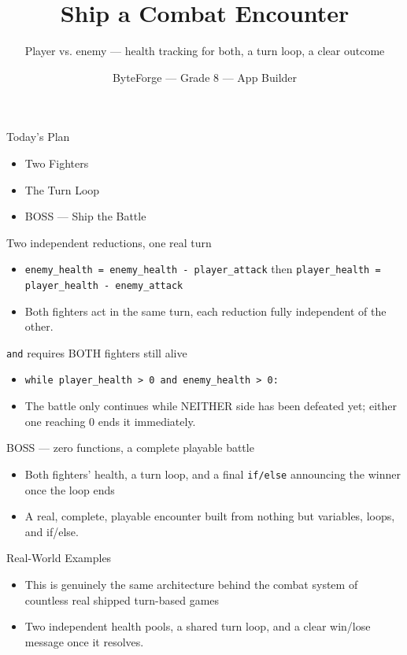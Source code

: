 \documentclass[aspectratio=169]{beamer}
\title{Ship a Combat Encounter}
\subtitle{Player vs. enemy — health tracking for both, a turn loop, a clear outcome}
\author{ByteForge --- Grade 8 --- App Builder}
\date{}
\begin{document}
\begin{frame}
    \titlepage
\end{frame}

\begin{frame}{Today's Plan}
    \begin{itemize}
        \item Two Fighters
        \item The Turn Loop
        \item[$\bigstar$] BOSS --- Ship the Battle
    \end{itemize}
\end{frame}

\begin{frame}{Two independent reductions, one real turn}
    \large
    \begin{itemize}
        \item \texttt{enemy\_health = enemy\_health - player\_attack} then \texttt{player\_health = player\_health - enemy\_attack}
        \item Both fighters act in the same turn, each reduction fully independent of the other.
    \end{itemize}
\end{frame}


\begin{frame}{\texttt{and} requires BOTH fighters still alive}
    \large
    \begin{itemize}
        \item \texttt{while player\_health > 0 and enemy\_health > 0:}
        \item The battle only continues while NEITHER side has been defeated yet; either one reaching 0 ends it immediately.
    \end{itemize}
\end{frame}


\begin{frame}{BOSS — zero functions, a complete playable battle}
    \large
    \begin{itemize}
        \item Both fighters' health, a turn loop, and a final \texttt{if/else} announcing the winner once the loop ends
        \item A real, complete, playable encounter built from nothing but variables, loops, and if/else.
    \end{itemize}
\end{frame}

\begin{frame}{Real-World Examples}
    \large
    \begin{itemize}
        \item This is genuinely the same architecture behind the combat system of countless real shipped turn-based games
        \item Two independent health pools, a shared turn loop, and a clear win/lose message once it resolves.
    \end{itemize}
\end{frame}
\end{document}
